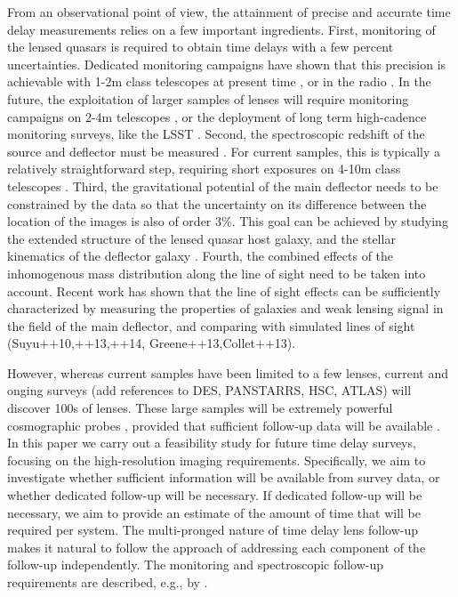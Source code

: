 \documentclass[a4paper,11pt]{article}
\begin{document}
From an observational point of view, the attainment of precise and
accurate time delay measurements relies on a few important
ingredients. First, monitoring of the lensed quasars is required to
obtain time delays with a few percent uncertainties. Dedicated
monitoring campaigns have shown that this precision is achievable with
1-2m class telescopes at present time \citep{Tewes++13}, or in the
radio \citep{Fassnacht++2002}. In the future, the exploitation of
larger samples of lenses will require monitoring campaigns on 2-4m
telescopes
\citep{Treu++13}, or the deployment of long term high-cadence
monitoring surveys, like the LSST
\citep{Liao++15}. Second, the spectroscopic redshift of the source and deflector
must be measured . For current samples, this is typically a relatively
straightforward step, requiring short exposures on 4-10m class
telescopes \citep{Fassnacht+Cohen1998,Eigenbrod++07}.  Third, the
gravitational potential of the main deflector needs to be constrained
by the data so that the uncertainty on its difference between the
location of the images is also of order 3\%. This goal can be achieved
by studying the extended structure of the lensed quasar host galaxy,
and the stellar kinematics of the deflector galaxy
\citep{Treu+Koopmans2002,Koopmans++2003,Suyu++2010,Suyu++2013,Suyu++2014}. 
Fourth, the combined effects of the inhomogenous mass distribution
along the line of sight need to be taken into account. Recent work has
shown that the line of sight effects can be sufficiently characterized
by measuring the properties of galaxies and weak lensing signal in the
field of the main deflector, and comparing with simulated lines of
sight (Suyu++10,++13,++14, Greene++13,Collet++13).

However, whereas current samples have been limited to a few lenses,
current and onging surveys (add references to DES, PANSTARRS, HSC,
ATLAS) will discover 100s of lenses. These large samples will be
extremely powerful cosmographic probes
\citep{Coe+Moustakas09,Linder11}, provided that sufficient follow-up
data will be available \citep{Treu+13}. In this paper we carry out a
feasibility study for future time delay surveys, focusing on the
high-resolution imaging requirements. Specifically, we aim to
investigate whether sufficient information will be available from
survey data, or whether dedicated follow-up will be necessary. If
dedicated follow-up will be necessary, we aim to provide an estimate
of the amount of time that will be required per system. The
multi-pronged nature of time delay lens follow-up makes it natural to
follow the approach of addressing each component of the follow-up
independently. The monitoring and spectroscopic follow-up requirements
are described, e.g., by \citet{Eigenbrod++05,Linder15}.
\end{document}
